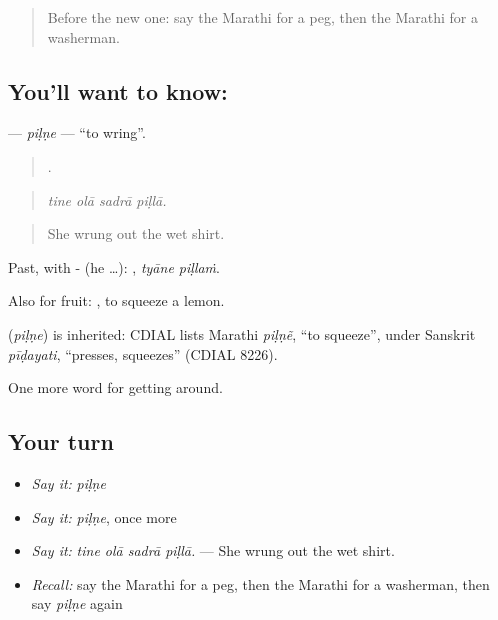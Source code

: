 \label{lesson:MR-C416-pilne}



\begin{quote}
Before the new one: say the Marathi for a peg, then the Marathi for a washerman.
\end{quote}

\subsection*{You'll want to know: }
\textbf{} — \emph{piḷṇe} — \textquotedblleft{}to wring\textquotedblright{}.

\begin{quote}
   .
\end{quote}

\begin{quote}
\emph{tine olā sadrā piḷlā.}
\end{quote}

\begin{quote}
She wrung out the wet shirt.
\end{quote}

Past, with - (he …):  , \emph{tyāne piḷlaṁ}.

Also for fruit:  , to squeeze a lemon.

\begin{cousinweb}
\textbf{} (\emph{piḷṇe}) is inherited: CDIAL lists Marathi \emph{piḷṇẽ}, \textquotedblleft{}to squeeze\textquotedblright{}, under Sanskrit \emph{pīḍayati}, \textquotedblleft{}presses, squeezes\textquotedblright{} (CDIAL 8226).
\end{cousinweb}

\begin{grammarlens}[title={What you've built}]
One more word for getting around.
\end{grammarlens}

\subsection*{Your turn}
\begin{itemize}
\raggedright
  \item \emph{Say it:} \emph{piḷṇe}
  \item \emph{Say it:} \emph{piḷṇe}, once more
  \item \emph{Say it:} \emph{tine olā sadrā piḷlā.} — She wrung out the wet shirt.
  \item \emph{Recall:} say the Marathi for a peg, then the Marathi for a washerman, then say \emph{piḷṇe} again
\end{itemize}

